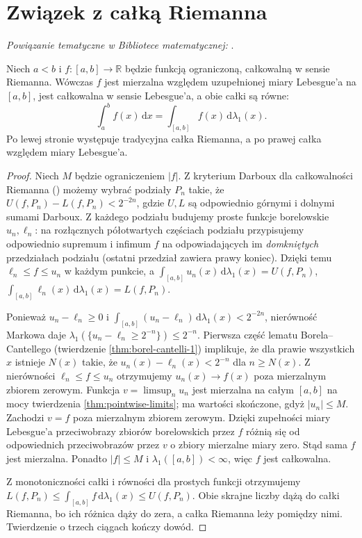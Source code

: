 \section{Związek z całką Riemanna}

\noindent\emph{Powiązanie tematyczne w Bibliotece matematycznej:} .


\begin{twierdzenie}
\label{thm:riemann-to-lebesgue}
Niech $a<b$ i $f:[a,b]\to\mathbb R$ będzie funkcją
ograniczoną, całkowalną w sensie Riemanna.
Wówczas $f$ jest mierzalna względem uzupełnionej
miary Lebesgue'a na $[a,b]$, jest całkowalna
w sensie Lebesgue'a, a obie całki są równe:
\[
\int_a^b f(x)\,\mathrm dx
=\int_{[a,b]}f(x)\,\mathrm d\lambda_1(x).
\]
Po lewej stronie występuje tradycyjna całka Riemanna,
a po prawej całka względem miary Lebesgue'a.
\end{twierdzenie}
\begin{proof}
Niech $M$ będzie ograniczeniem $|f|$.
Z kryterium Darboux dla całkowalności Riemanna
()
możemy wybrać podziały $P_n$ takie, że
$U(f,P_n)-L(f,P_n)<2^{-2n}$,
gdzie $U,L$ są odpowiednio górnymi i dolnymi
sumami Darboux. Z każdego podziału budujemy
proste funkcje borelowskie $u_n,\ell_n$:
na rozłącznych półotwartych częściach podziału
przypisujemy odpowiednio supremum i infimum $f$
na odpowiadających im \emph{domkniętych} przedziałach
podziału (ostatni przedział zawiera prawy koniec).
Dzięki temu $\ell_n\le f\le u_n$ w każdym punkcie,
a $\int_{[a,b]}u_n(x)\,\mathrm d\lambda_1(x)=U(f,P_n)$,
$\int_{[a,b]}\ell_n(x)\,\mathrm d\lambda_1(x)=L(f,P_n)$.

Ponieważ $u_n-\ell_n\ge0$ i
$\int_{[a,b]}(u_n-\ell_n)\,\mathrm d\lambda_1(x)
<2^{-2n}$, nierówność Markowa daje
$\lambda_1(\{u_n-\ell_n\ge2^{-n}\})\le2^{-n}$.
Pierwsza część lematu Borela--Cantellego (twierdzenie \ref{thm:borel-cantelli-1}) implikuje,
że dla prawie wszystkich $x$ istnieje $N(x)$ takie,
że $u_n(x)-\ell_n(x)<2^{-n}$ dla $n\ge N(x)$.
Z nierówności $\ell_n\le f\le u_n$ otrzymujemy
$u_n(x)\to f(x)$ poza mierzalnym zbiorem zerowym.
Funkcja $v=\limsup_n u_n$ jest mierzalna na całym
$[a,b]$ na mocy twierdzenia \ref{thm:pointwise-limits};
ma wartości skończone, gdyż $|u_n|\le M$.
Zachodzi $v=f$ poza mierzalnym zbiorem zerowym.
Dzięki zupełności miary Lebesgue'a przeciwobrazy zbiorów
borelowskich przez $f$ różnią się od odpowiednich
przeciwobrazów przez $v$ o zbiory mierzalne miary zero.
Stąd sama $f$ jest mierzalna. Ponadto $|f|\le M$
i $\lambda_1([a,b])<\infty$, więc $f$ jest całkowalna.

Z monotoniczności całki i równości dla prostych
funkcji otrzymujemy
$L(f,P_n)\le\int_{[a,b]}f\,\mathrm d\lambda_1(x)
\le U(f,P_n)$. Obie skrajne liczby dążą do
całki Riemanna, bo ich różnica dąży do zera,
a całka Riemanna leży pomiędzy nimi.
Twierdzenie o trzech ciągach kończy dowód.
\end{proof}

